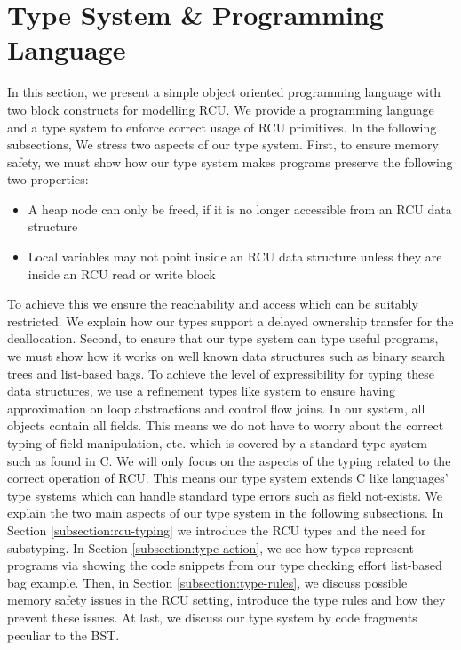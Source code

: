 \makeatletter %
\def\arcr{\@arraycr}
\makeatother
\section{Type System \& Programming Language}
In this section, we present a simple object oriented programming language with two block constructs for modelling \textsf{RCU}. We provide a programming language and a type system to enforce correct usage of RCU primitives. In the following subsections, We stress two aspects of our type system.
First, to ensure memory safety, we must show how our type system makes programs preserve the following two properties:
\begin{itemize}
\item A heap node can only be freed, if it is no longer accessible from an RCU data structure
\item Local variables may not point inside an RCU data structure unless they are inside an \textsf{RCU} read or write block
\end{itemize}
To achieve this we ensure the reachability and access which can be suitably restricted. We explain how our types support a delayed ownership transfer for the deallocation.
Second, to ensure that our type system can type useful programs, we must show how it works on well known data structures such as binary search trees and list-based bags. To achieve the level of expressibility for typing these data structures, we use a refinement types like system to ensure having approximation on loop abstractions and control flow joins.
In our system, all objects contain all fields.  This means we do not have to worry about the correct typing of field manipulation, etc. which is covered by a standard type system such as found in C. We will only focus on the aspects of the typing related to the correct operation of RCU. This means our type system extends C like languages' type systems which can handle standard type errors such as field not-exists.
We explain the two main aspects of our type system in the following subsections. In Section \ref{subsection:rcu-typing} we introduce the \textsf{RCU} types and the need for substyping. In Section \ref{subsection:type-action}, we see how types represent programs via showing the code snippets from our type checking effort list-based bag example. Then, in Section \ref{subsection:type-rules}, we discuss possible memory safety issues in the \textsf{RCU} setting, introduce the type rules and how they prevent these issues. At last, we discuss our type system by code fragments peculiar to the \textsf{BST}. 
